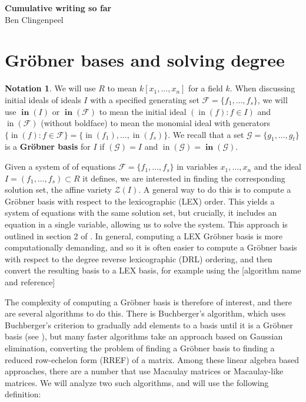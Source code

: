 \documentclass[11pt]{article}
\newcommand{\F}{\mathcal{F}}
\DeclareMathOperator{\init}{in}
\DeclareMathOperator{\Init}{\mathbf{in}}
\theoremstyle{definition}
\newtheorem*{notation}{Notation}
\begin{document}
\begin{center}
	\Huge{\textbf{Cumulative writing so far}}\\
	\vspace{.5em}
	\normalsize{Ben Clingenpeel}
\end{center}

\section{Gröbner bases and solving degree}

\begin{notation}
	We will use $R$ to mean $k[x_1, \dots, x_n]$ for a field $k$. When discussing initial ideals of ideals $I$ with a specified generating set $\F = \{f_1, \dots, f_s\}$, we will use $\Init(I)$ or $\Init(\F)$ to mean the initial ideal $(\init(f): f \in I)$ and $\init(\F)$ (without boldface) to mean the monomial ideal with generators $\{\init(f): f \in \F\} = \{\init(f_1), \dots, \init(f_s)\}$. We recall that a set $\mathcal{G} = \{g_1, \dots, g_t\}$ is a \textbf{Gröbner basis} for $I$ if $(\mathcal{G}) = I$ and $\init(\mathcal{G}) = \Init(\mathcal{G})$.
\end{notation}

Given a system of of equations $\mathcal{F} = \{f_1, \dots, f_s\}$ in variables $x_1, \dots, x_n$ and the ideal $I = (f_1, \dots, f_s) \subset R$ it defines, we are interested in finding the corresponding solution set, the affine variety $\mathcal{Z}(I)$. A general way to do this is to compute a Gröbner basis with respect to the lexicographic (LEX) order. This yields a system of equations with the same solution set, but crucially, it includes an equation in a single variable, allowing us to solve the system. This approach is outlined in section 2 of \cite{caminata2020solving}. In general, computing a LEX Gröbner basis is more computationally demanding, and so it is often easier to compute a Gröbner basis with respect to the degree reverse lexicographic (DRL) ordering, and then convert the resulting basis to a LEX basis, for example using the \color{red} [algorithm name and reference] \color{black}

The complexity of computing a Gröbner basis is therefore of interest, and there are several algorithms to do this. There is Buchberger's algorithm, which uses Buchberger's criterion to gradually add elements to a basis until it is a Gröbner basis (see \cite{cox2013ideals}), but many faster algorithms take an approach based on Gaussian elimination, converting the problem of finding a Gröbner basis to finding a reduced row-echelon form (RREF) of a matrix. Among these linear algebra based approaches, there are a number that use Macaulay matrices or Macaulay-like matrices. We will analyze two such algorithms, and will use the following definition:
\end{document}
